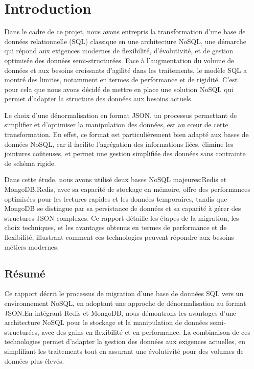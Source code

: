 \chapter{Introduction}

Dans le cadre de ce projet, nous avons entrepris la transformation d'une base de données relationnelle (SQL) classique en une architecture NoSQL, une démarche qui répond aux exigences modernes de flexibilité, d'évolutivité, et de gestion optimisée des données semi-structurées. Face à l’augmentation du volume de données et aux besoins croissants d’agilité dans les traitements, le modèle SQL a montré des limites, notamment en termes de performance et de rigidité. C’est pour cela que nous avons décidé de mettre en place une solution NoSQL qui permet d’adapter la structure des données aux besoins actuels.

Le choix d'une dénormalisation en format JSON, un processus permettant de simplifier et d’optimiser la manipulation des données, est au cœur de cette transformation. En effet, ce format est particulièrement bien adapté aux bases de données NoSQL, car il facilite l’agrégation des informations liées, élimine les jointures coûteuses, et permet une gestion simplifiée des données sans contrainte de schéma rigide.

Dans cette étude, nous avons utilisé deux bases NoSQL majeures:\@ Redis et MongoDB.\@ Redis, avec sa capacité de stockage en mémoire, offre des performances optimisées pour les lectures rapides et les données temporaires, tandis que MongoDB se distingue par sa persistance de données et sa capacité à gérer des structures JSON complexes. Ce rapport détaille les étapes de la migration, les choix techniques, et les avantages obtenus en termes de performance et de flexibilité, illustrant comment ces technologies peuvent répondre aux besoins métiers modernes.

\vspace{5cm}

\section*{Résumé}
\begin{center}
Ce rapport décrit le processus de migration d'une base de données SQL vers un environnement NoSQL, en adoptant une approche de dénormalisation au format JSON.\@ En intégrant Redis et MongoDB, nous démontrons les avantages d'une architecture NoSQL pour le stockage et la manipulation de données semi-structurées, avec des gains en flexibilité et en performance. La combinaison de ces technologies permet d'adapter la gestion des données aux exigences actuelles, en simplifiant les traitements tout en assurant une évolutivité pour des volumes de données plus élevés.
\end{center}
